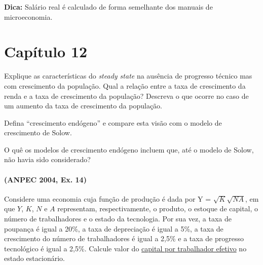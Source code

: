 \documentclass[12pt,a4paper]{article}
\begin{document}
\textbf{Dica:} Salário real é calculado de forma semelhante dos manuais de microeconomia.

\newpage\section*{Capítulo 12}

\problem Explique as características do \textit{steady state} na ausência de progresso técnico mas com crescimento da população. Qual a relação entre a taxa de crescimento da renda e a taxa de crescimento da população? Descreva o que ocorre no caso de um aumento da taxa de crescimento da população.

\problem Defina “crescimento endógeno” e compare esta visão com o modelo de crescimento de Solow.

\problem O quê os modelos de crescimento endógeno incluem que, até o modelo de Solow, não havia sido considerado?

\problem \paragraph{(ANPEC 2004, Ex. 14)} Considere uma economia cuja função de produção é dada por Y = $\sqrt{K}\sqrt{NA}$, em que $Y$, $K$, $N$ e $A$ representam, respectivamente, o produto, o estoque de capital, o número de trabalhadores e o estado da tecnologia. Por sua vez, a taxa de poupança é igual a 20\%, a taxa de depreciação é igual a 5\%, a taxa de crescimento do número de trabalhadores é igual a 2,5\% e a taxa de progresso tecnológico é igual a 2,5\%. Calcule valor do \underline{capital por trabalhador efetivo} no estado estacionário. 
\end{document}
